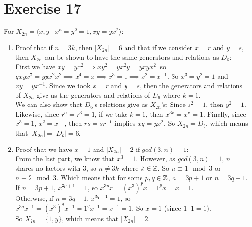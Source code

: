 \documentclass[12pt]{article}
\begin{document}
    \section*{Exercise 17}
    For $X_{2n} = \langle x, y \mid x^n = y^2 = 1, xy = yx^2 \rangle$: \\
    \begin{enumerate}[label=\textbf{\alph*.}]
        \item 
            Proof that if $n = 3k$, then $|X_{2n}| = 6$
            and that if we consider $x = r$ and $y = s$,
            then $X_{2n}$ can be shown to have the same generators and 
            relations as $D_6$: \\
            First we have $xy = yx^2
            \implies xy^2 = yx^2y = yxyx^2$,
            so $yxyx^2 = yyx^2x^2 \implies
            x^4 = x
            \implies x^3 = 1
            \implies x^2 = x^{-1}$.
            So $x^3 = y^2 = 1$ and $xy = yx^{-1}$.
            Since we took $x = r$ and $y = s$,
            then the generators and relations of $X_{2n}$ give us the
            generators and relations of $D_6$ where $k = 1$. \\
            We can also show that $D_6$'s relations give us $X_{2n}$'s:
            Since $s^2 = 1$, then $y^2 = 1$.
            Likewise, since $r^n = r^3 = 1$,
            if we take $k = 1$,
            then $x^{3k} = x^n = 1$.
            Finally, since $x^3 = 1$, $x^2 = x^{-1}$,
            then $rs = sr^{-1}$ implies $xy = yx^{2}$.
            So $X_{2n} = D_6$,
            which means that $|X_{2n}| = |D_6| = 6$.
        \item 
            Proof that we have $x = 1$ and $|X_{2n}| = 2$
            if $gcd(3, n) = 1$: \\
            From the last part, we know that $x^3 = 1$.
            However, as $gcd(3, n) = 1$, $n$ shares no factors with 3,
            so $n \neq 3k$ where $k \in \mathbb{Z}$.
            So $n \equiv 1 \mod 3$ or $n \equiv 2 \mod 3$. 
            Which means that for some $p, q \in \mathbb{Z}$,
            $n = 3p + 1$ or $n = 3q - 1$. \\
            If $n = 3p + 1$, $x^{3p + 1} = 1$,
            so $x^{3p}x = (x^3)^px = 1^px = x = 1$. \\
            Otherwise, if $n = 3q - 1$, $x^{3q - 1} = 1$,
            so $x^{3q}x^{-1} = (x^3)^qx^{-1} = 1^qx^{-1} = x^{-1} = 1$.
            So $x = 1$ (since $1 \cdot 1 = 1$). \\
            So $X_{2n} = \{1, y\}$,
            which means that $|X_{2n}| = 2$.
    \end{enumerate}   
\end{document}
